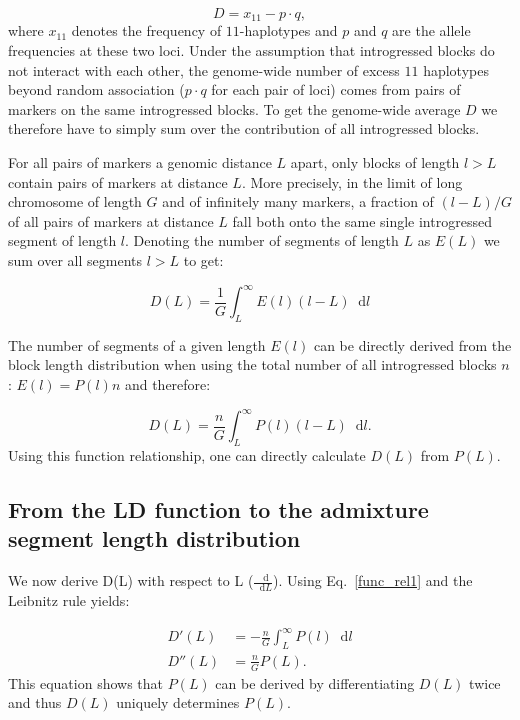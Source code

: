 \documentclass[11pt]{article}
\newcommand*\diff{\mathop{}\!\mathrm{d}}
\begin{document}
\begin{equation}
D = x_{11} - p \cdot q,
\end{equation}
where $x_{11}$ denotes the frequency of $11$-haplotypes and $p$ and $q$ are the allele frequencies at these two loci. Under the assumption that introgressed blocks do not interact with each other, the genome-wide number of excess $11$ haplotypes beyond random association ($p\cdot q$ for each pair of loci) comes from pairs of markers on the same introgressed blocks. To get the genome-wide average $D$ we therefore have to simply sum over the contribution of all introgressed blocks.

For all pairs of markers a genomic distance $L$ apart, only blocks of length $l>L$ contain pairs of markers at distance $L$. More precisely, in the limit of long chromosome of length $G$ and of infinitely many markers, a fraction of $(l-L)/G$ of all pairs of markers at distance $L$ fall both onto the same single introgressed segment of length $l$. Denoting the number of segments of length $L$ as $E(L)$ we sum over all segments $l>L$ to get:

\begin{equation}
D(L) = \frac{1}{G} \int_L^\infty E(l) (l-L) \diff l
\end{equation}

The number of segments of a given length $E(l)$ can be directly derived from the block length distribution when using the total number of all introgressed blocks $n$: $E(l) = P(l) n$ and therefore:

\begin{equation}
D(L) = \frac{n}{G} \int_L^\infty P(l) (l-L) \diff l.
\label{func_rel1}
\end{equation}
Using this function relationship, one can directly calculate $D(L)$ from $P(L)$. 

\subsection{From the LD function to the admixture segment length distribution}
We now derive D(L) with respect to L ($\frac{\diff}{\diff L}$). Using Eq.~\ref{func_rel1} and the Leibnitz rule yields:

\begin{align}
D'(L) &= -\frac{n}{G} \int_L^\infty P(l) \diff l \\
D''(L) &= \frac{n}{G} P(L). \label{eq_hr2}
\end{align}
This equation shows that $P(L)$ can be derived by differentiating $D(L)$ twice and thus $D(L)$ uniquely determines $P(L)$.
\end{document}
